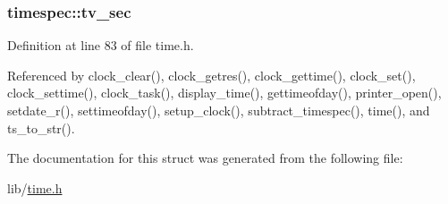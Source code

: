 \hypertarget{structtimespec_afc3302668d7cb5952f590da69fdd4955}{
\subsubsection[{tv\-\_\-sec}]{ timespec\-::tv\-\_\-sec}}\label{structtimespec_afc3302668d7cb5952f590da69fdd4955}


Definition at line 83 of file time.\-h.



Referenced by clock\-\_\-clear(), clock\-\_\-getres(), clock\-\_\-gettime(), clock\-\_\-set(), clock\-\_\-settime(), clock\-\_\-task(), display\-\_\-time(), gettimeofday(), printer\-\_\-open(), setdate\-\_\-r(), settimeofday(), setup\-\_\-clock(), subtract\-\_\-timespec(), time(), and ts\-\_\-to\-\_\-str().



The documentation for this struct was generated from the following file\-:\begin{DoxyCompactItemize}
\item 
lib/\hyperlink{time_8h}{time.\-h}\end{DoxyCompactItemize}

